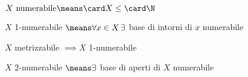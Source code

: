 \begin{defn}[Numerabilità]
$X\text{ numerabile}\means\card X\leq\card\N$
\end{defn}

\begin{defn}
$X$ 1-numerabile $\means\forall x\in X\,\exists$ base di intorni di $x$ numerabile
\end{defn}

\begin{prop}
$X$ metrizzabile $\implies X$ 1-numerabile
\end{prop}

\begin{defn}
$X$ 2-numerabile $\means\exists$ base di aperti di $X$ numerabile
\end{defn}
